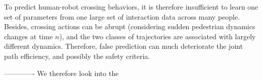 \documentclass[conference]{IEEEtran}
\begin{document}
To predict human-robot crossing behaviors, it is therefore insufficient to learn
one set of parameters from one large set of interaction data across many people. 
Besides, crossing actions can be abrupt (considering 
sudden pedestrian dynamics changes at time $n$), and the two classes of 
trajectories are associated with largely different dynamics. Therefore, false 
prediction can much deteriorate the joint path efficiency, and possibly the 
safety criteria. 






-------------
We therefore look into the 
\vspace{-.3em}
\end{document}
